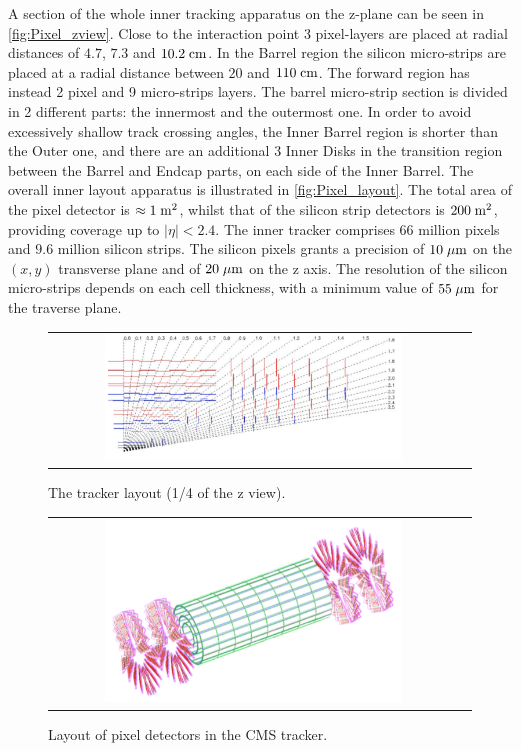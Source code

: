 A section of the whole inner tracking apparatus on the z-plane can be seen in \autoref{fig:Pixel_zview}. Close to the interaction point 3 pixel-layers are placed at radial distances of $4.7$, $7.3$ and $10.2\;\text{cm}$. In the Barrel region the silicon micro-strips are placed at a radial distance between $20$ and $110\;\text{cm}$. The forward region has instead 2 pixel and 9 micro-strips layers. The barrel micro-strip section is divided in 2 different parts: the innermost and the outermost one. In order to avoid excessively shallow track crossing angles, the Inner Barrel region is shorter than the Outer one, and there are an additional 3 Inner Disks in the transition region between the Barrel and Endcap parts, on each side of the Inner Barrel. The overall inner layout apparatus is illustrated in \autoref{fig:Pixel_layout}. The total area of the pixel detector is $\approx 1\;\text{m}^{2}$, whilst that of the silicon strip detectors is $200\;\text{m}^{2}$, providing coverage up to $|\eta| < 2.4$. The inner tracker comprises 66 million pixels and $9.6$ million silicon strips. The silicon pixels grants a precision of $10\;\mu\text{m}$ on the $(x,y)$ transverse plane and of $20\;\mu\text{m}$ on the z axis. The resolution of the silicon micro-strips depends on each cell thickness, with a minimum value of $ 55\;\mu\text{m}$ for the traverse plane.


\begin{figure}[tbh!]
	\centering
	\begin{tabular}{cc}
		\includegraphics[width=0.75\textwidth]{detector/pics/Pixel_zview.pdf}
	\end{tabular}
	\caption{The tracker layout (1/4 of the z view).}
	\label{fig:Pixel_zview}
\end{figure}

\begin{figure}[tbh!]
	\centering
	\begin{tabular}{cc}
		\includegraphics[width=0.75\textwidth]{detector/pics/Pixel_layout.pdf}
	\end{tabular}
	\caption{Layout of pixel detectors in the CMS tracker.}
	\label{fig:Pixel_layout}
\end{figure}

